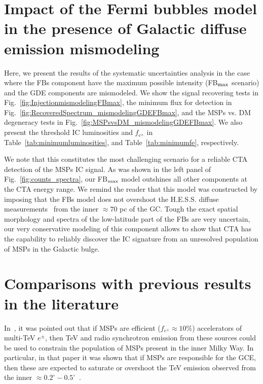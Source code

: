 \documentclass[doublespace,draft,nopageskip]{VTthesis} %
\begin{document}
\begin{appendices}
\section{Impact of the Fermi bubbles model in the presence of Galactic diffuse emission mismodeling}
\label{appdx:FBmaxandmismodeling}

Here, we present the results of the systematic uncertainties analysis in the case where the FBs component have the maximum possible intensity (FB$_{\rm max}$ scenario) and the GDE components are mismodeled. We show the signal recovering tests in Fig.~\ref{fig:InjectionmismodelingFBmax}, the minimum flux for detection in Fig.~\ref{fig:RecoveredSpectrum_mismodelingGDEFBmax}, and the MSPs vs. DM degeneracy tests in Fig.~\ref{fig:MSPsvsDM_mismodelingGDEFBmax}. We also present the threshold IC luminosities and $f_{e^\pm}$ in Table~\ref{tab:minimumluminosities}, and Table~\ref{tab:minimumfe}, respectively. 

 We note that this constitutes the most challenging scenario for a reliable CTA detection of the MSPs IC signal. As was shown in the left panel of Fig.~\ref{fig:counts_spectra}, our FB$_{\rm max}$ model outshines all other components at the CTA energy range. We remind the reader that this model was constructed by imposing that the FBs model does not overshoot the H.E.S.S. diffuse  measurements~\citep{Abramowski:2016mir} from the inner $\approx 70$ pc of the GC. Tough the exact spatial morphology and spectra of the low-latitude part of the FBs are very uncertain, our very conservative modeling of this component allows to show that CTA has the capability to reliably discover the IC signature from an unresolved population of MSPs in the Galactic bulge.    
 
 \section{Comparisons with previous results in the literature}
 
 In~\citet{Hooper:2018fih}, it was pointed out that if MSPs are efficient ($f_{e^\pm}\approx 10\%$) accelerators of multi-TeV $e^\pm$, then TeV and radio
synchrotron emission from these sources could be used to constrain the population of MSPs present in the inner Milky Way. In particular, in that paper it was shown that if MSPs are responsible for the GCE, then these are expected to saturate or overshoot the TeV emission observed from the inner $\approx 0.2^\circ-0.5^\circ$~\citep{Abramowski:2016mir}. 
 

\end{appendices}
\end{document}
